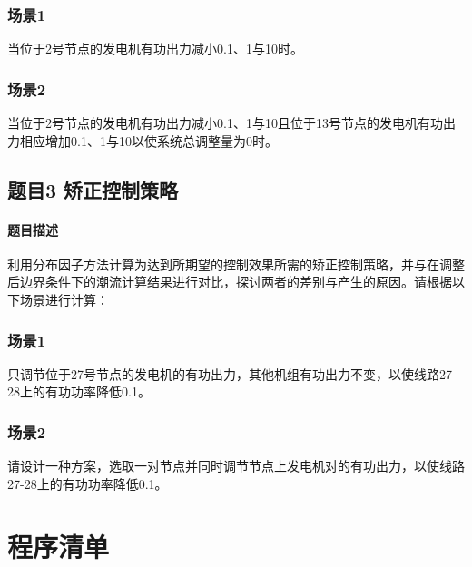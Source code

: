 \documentclass[a4paper,12pt]{article}
\begin{document}
    \subsubsection{场景1} 当位于2号节点的发电机有功出力减小0.1、1与10时。
    \subsubsection{场景2} 当位于2号节点的发电机有功出力减小0.1、1与10且位于13号节点的发电机有功出力相应增加0.1、1与10以使系统总调整量为0时。

    \subsection{题目3 矫正控制策略}
    \paragraph{题目描述} 利用分布因子方法计算为达到所期望的控制效果所需的矫正控制策略，并与在调整后边界条件下的潮流计算结果进行对比，探讨两者的差别与产生的原因。请根据以下场景进行计算：
    \subsubsection{场景1} 只调节位于27号节点的发电机的有功出力，其他机组有功出力不变，以使线路27-28上的有功功率降低0.1。
    \subsubsection{场景2} 请设计一种方案，选取一对节点并同时调节节点上发电机对的有功出力，以使线路27-28上的有功功率降低0.1。

    
    
    \appendix
    \section{程序清单}
      
    \label{applastpage}
\iffalse
\begin{itemize}[noitemsep,topsep=0pt]
\end{itemize}
\begin{enumerate}[label=\Roman{*}.,noitemsep,topsep=0pt]
\end{enumerate}
\begin{multicols}{2}
\end{multicols}
\fi
\end{document}

